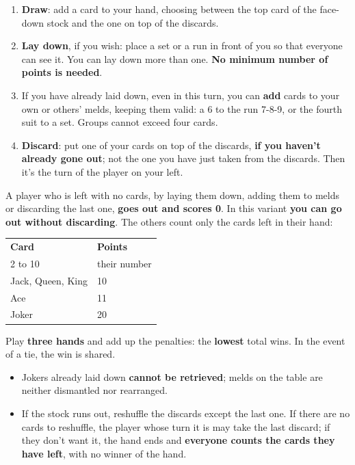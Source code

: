 \documentclass[10pt]{article}
\begin{document}
\startpage
{}
\begin{enumerate}
 \item \textbf{Draw}: add a card to your hand, choosing between the top card of the face-down stock and the one on top of the discards.
 \item \textbf{Lay down}, if you wish: place a set or a run in front of you so that everyone can see it. You can lay down more than one. \textbf{No minimum number of points is needed}.
 \item If you have already laid down, even in this turn, you can \textbf{add} cards to your own or others’ melds, keeping them valid: a 6\sC{} to the run 7-8-9\sC{}, or the fourth suit to a set. Groups cannot exceed four cards.
 \item \textbf{Discard}: put one of your cards on top of the discards, \textbf{if you haven’t already gone out}; not the one you have just taken from the discards. Then it’s the turn of the player on your left.
\end{enumerate}
A player who is left with no cards, by laying them down, adding them to melds or discarding the last one, \textbf{goes out and scores 0}. In this variant \textbf{you can go out without discarding}. The others count only the cards left in their hand:
\begin{center}\small\setlength{\tabcolsep}{3mm}\renewcommand{\arraystretch}{1.3}
\begin{tabular}{@{}m{45mm}C{25mm}@{}}
\textbf{Card} & \textbf{Points}\\
2 to 10 & their number\\
Jack, Queen, King & 10\\
Ace & 11\\
Joker & 20\\
\end{tabular}
\end{center}
Play \textbf{three hands} and add up the penalties: the \textbf{lowest} total wins. In the event of a tie, the win is shared.
\begin{itemize}
 \item Jokers already laid down \textbf{cannot be retrieved}; melds on the table are neither dismantled nor rearranged.
 \item If the stock runs out, reshuffle the discards except the last one. If there are no cards to reshuffle, the player whose turn it is may take the last discard; if they don’t want it, the hand ends and \textbf{everyone counts the cards they have left}, with no winner of the hand.
\end{itemize}
\vfill
{}
\end{document}
